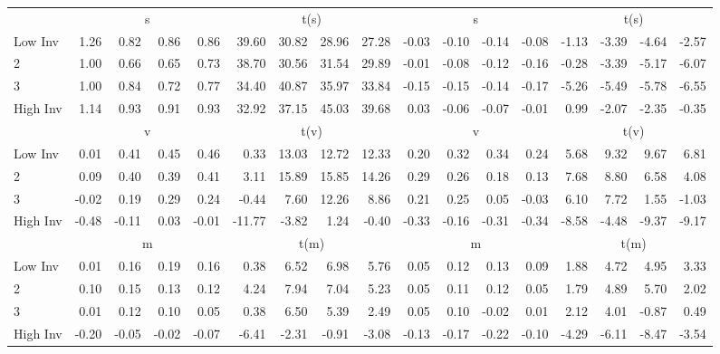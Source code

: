 \begin{table}[!ht]
\begin{tabular}{lrrrrrrrrrrrrrrrr}
  
     & \multicolumn{4}{c}{s} & \multicolumn{4}{c}{t(s)}  & \multicolumn{4}{c}{s} & \multicolumn{4}{c}{t(s)}   \\
     \cmidrule(r){2-5} \cmidrule(r){6-9}  \cmidrule(r){10-13} \cmidrule(r){14-17} 
    Low Inv  & 1.26  & 0.82  & 0.86  & 0.86  & 39.60  & 30.82  & 28.96  & 27.28  & -0.03  & -0.10  & -0.14  & -0.08  & -1.13  & -3.39  & -4.64  & -2.57   \\
    2  & 1.00  & 0.66  & 0.65  & 0.73  & 38.70  & 30.56  & 31.54  & 29.89  & -0.01  & -0.08  & -0.12  & -0.16  & -0.28  & -3.39  & -5.17  & -6.07   \\
    3  & 1.00  & 0.84  & 0.72  & 0.77  & 34.40  & 40.87  & 35.97  & 33.84  & -0.15  & -0.15  & -0.14  & -0.17  & -5.26  & -5.49  & -5.78  & -6.55   \\
    High Inv  & 1.14  & 0.93  & 0.91  & 0.93  & 32.92  & 37.15  & 45.03  & 39.68  & 0.03  & -0.06  & -0.07  & -0.01  & 0.99  & -2.07  & -2.35  & -0.35   \\
    
  
     & \multicolumn{4}{c}{v} & \multicolumn{4}{c}{t(v)}  & \multicolumn{4}{c}{v} & \multicolumn{4}{c}{t(v)}   \\
     \cmidrule(r){2-5} \cmidrule(r){6-9}  \cmidrule(r){10-13} \cmidrule(r){14-17} 
    Low Inv  & 0.01  & 0.41  & 0.45  & 0.46  & 0.33  & 13.03  & 12.72  & 12.33  & 0.20  & 0.32  & 0.34  & 0.24  & 5.68  & 9.32  & 9.67  & 6.81   \\
    2  & 0.09  & 0.40  & 0.39  & 0.41  & 3.11  & 15.89  & 15.85  & 14.26  & 0.29  & 0.26  & 0.18  & 0.13  & 7.68  & 8.80  & 6.58  & 4.08   \\
    3  & -0.02  & 0.19  & 0.29  & 0.24  & -0.44  & 7.60  & 12.26  & 8.86  & 0.21  & 0.25  & 0.05  & -0.03  & 6.10  & 7.72  & 1.55  & -1.03   \\
    High Inv  & -0.48  & -0.11  & 0.03  & -0.01  & -11.77  & -3.82  & 1.24  & -0.40  & -0.33  & -0.16  & -0.31  & -0.34  & -8.58  & -4.48  & -9.37  & -9.17   \\
    
  
     & \multicolumn{4}{c}{m} & \multicolumn{4}{c}{t(m)}  & \multicolumn{4}{c}{m} & \multicolumn{4}{c}{t(m)}   \\
     \cmidrule(r){2-5} \cmidrule(r){6-9}  \cmidrule(r){10-13} \cmidrule(r){14-17} 
    Low Inv  & 0.01  & 0.16  & 0.19  & 0.16  & 0.38  & 6.52  & 6.98  & 5.76  & 0.05  & 0.12  & 0.13  & 0.09  & 1.88  & 4.72  & 4.95  & 3.33   \\
    2  & 0.10  & 0.15  & 0.13  & 0.12  & 4.24  & 7.94  & 7.04  & 5.23  & 0.05  & 0.11  & 0.12  & 0.05  & 1.79  & 4.89  & 5.70  & 2.02   \\
    3  & 0.01  & 0.12  & 0.10  & 0.05  & 0.38  & 6.50  & 5.39  & 2.49  & 0.05  & 0.10  & -0.02  & 0.01  & 2.12  & 4.01  & -0.87  & 0.49   \\
    High Inv  & -0.20  & -0.05  & -0.02  & -0.07  & -6.41  & -2.31  & -0.91  & -3.08  & -0.13  & -0.17  & -0.22  & -0.10  & -4.29  & -6.11  & -8.47  & -3.54   \\
    

\end{tabular}
\end{table}
